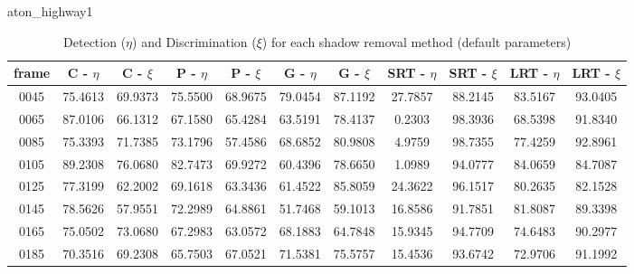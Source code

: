 \begin{appendices}
\begin{table}
\centering
\caption{aton\_highway1}
\caption*{Detection ($\eta$) and Discrimination ($\xi$) for each shadow removal method (default parameters)}
\begin{tabular}{ |c|c|c|c|c|c|c|c|c|c|c| }
	\hline
\textbf{frame} &  \textbf{C - $\eta$} &  \textbf{C - $\xi$} &  \textbf{P - $\eta$} &  \textbf{P - $\xi$} &  \textbf{G - $\eta$} &  \textbf{G - $\xi$} &  \textbf{SRT - $\eta$} &  \textbf{SRT - $\xi$} &  \textbf{LRT - $\eta$} &  \textbf{LRT - $\xi$} \\
\hline
\hline
0045 &  75.4613 &  69.9373 &   75.5500 &  68.9675 &   79.0454 &  87.1192 &   27.7857 &  88.2145 &   83.5167 &  93.0405    \\
\hline
0065 &  87.0106 &  66.1312 &   67.1580 &  65.4284 &   63.5191 &  78.4137 &   0.2303 &  98.3936 &   68.5398 &  91.8340    \\
\hline
0085 &  75.3393 &  71.7385 &   73.1796 &  57.4586 &   68.6852 &  80.9808 &   4.9759 &  98.7355 &   77.4259 &  92.8961    \\
\hline
0105 &  89.2308 &  76.0680 &   82.7473 &  69.9272 &   60.4396 &  78.6650 &   1.0989 &  94.0777 &   84.0659 &  84.7087    \\
\hline
0125 &  77.3199 &  62.2002 &   69.1618 &  63.3436 &   61.4522 &  85.8059 &   24.3622 &  96.1517 &   80.2635 &  82.1528    \\
\hline
0145 &  78.5626 &  57.9551 &   72.2989 &  64.8861 &   51.7468 &  59.1013 &   16.8586 &  91.7851 &   81.8087 &  89.3398    \\
\hline
0165 &  75.0502 &  73.0680 &   67.2983 &  63.0572 &   68.1883 &  64.7848 &   15.9345 &  94.7709 &   74.6483 &  90.2977    \\
\hline
0185 &  70.3516 &  69.2308 &   65.7503 &  67.0521 &   71.5381 &  75.5757 &   15.4536 &  93.6742 &   72.9706 &  91.1992    \\
\hline
\end{tabular}

\end{table}


\end{appendices}
